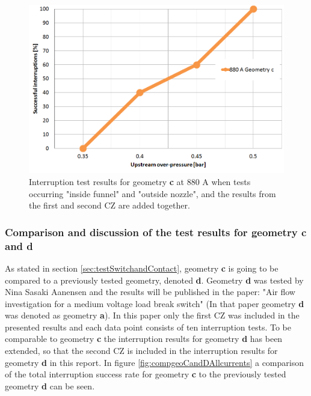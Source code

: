 \documentclass[10pt,b5paper,twoside]{article}
\begin{document}

\begin{figure}[H]
\centering
\includegraphics[scale=0.45]{Bilder/Results/geoC880amp.PNG}
\caption{Interruption test results for geometry \textbf{c} at 880 A when tests occurring "inside funnel" and "outside nozzle", and the results from the first and second CZ are added together.} \label{fig:results880AgeoC}
\end{figure}

\subsubsection{Comparison and discussion of the test results for geometry \textbf{c} and \textbf{d}}

As stated in section \ref{sec:testSwitchandContact}, geometry \textbf{c} is going to be compared to a previously tested geometry, denoted \textbf{d}. Geometry \textbf{d} was tested by Nina Sasaki Aanensen and the results will be published in the paper: "Air flow investigation for a medium voltage load break switch" \cite{bib:AFIMVLBA} (In that paper geometry \textbf{d} was denoted as geometry \textbf{a}). In this paper only the first CZ was included in the presented results and each data point consists of ten interruption tests. To be comparable to geometry \textbf{c} the interruption results for geometry \textbf{d} has been extended, so that the second CZ is included in the interruption results for geometry \textbf{d} in this report. In figure \ref{fig:compgeoCandDAllcurrents} a comparison of the total interruption success rate for geometry \textbf{c} to the previously tested geometry \textbf{d} can be seen.
\end{document}
